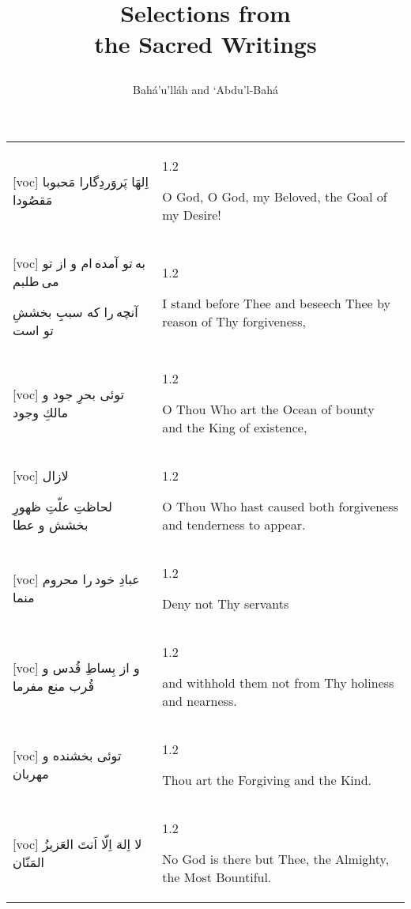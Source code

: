 \documentclass[11pt]{article}
\title{
\Huge
\vspace*{2in}
Selections from \\
the Sacred Writings \\
\vspace{.25in}
\fontsize{48}{36}
\begin{arab}
\end{arab}
\vspace{1in}}
\author{\LARGE Bahá’u’lláh and `Abdu'l-Bahá}
\date{}
\makeatletter
\newenvironment{orig}
  {\begin{farsi}[voc]}
  {\end{farsi}}
\newenvironment{trans}
  {\Large\begin{spacing}{1.2}\raggedright}
  {\end{spacing}}
\newenvironment{word}
  {\begin{tabular}[t]{p{2.75in}@{\hspace{3em}}p{2.875in}}}
  {\end{tabular}}
\newcommand{\ayat}[2]{\begin{orig}#1\end{orig} & \begin{trans}#2\end{trans}}
\makeatother
\begin{document}
\maketitle
\thispagestyle{empty}

\newpage

\fontsize{24}{32}

\begin{word}
\ayat{
اِلهَا پَروَردِگارا مَحبوبا مَقصُودا
}{O God, O God, my Beloved, the Goal of my Desire!} \\ \ayat{
به تو آمده ام و از تو می طلبم

آنچه را كه سببِ بخششِ تو است
}{I stand before Thee and beseech Thee by reason of Thy forgiveness,} \\ \ayat{
توئی بحرِ جود و مالكِ وجود
}{O Thou Who art the Ocean of bounty and the King of existence,} \\ \ayat{
لازال

لحاظتِ علّتِ ظهورِ بخشش و عطا
}{O Thou Who hast caused both forgiveness and tenderness to appear.} \\ \ayat{
عبادِ خود را محروم منما
}{Deny not Thy servants} \\ \ayat{
و از بِساطِ قُدس و قُرب منع مفرما
}{and withhold them not from Thy holiness and nearness.} \\ \ayat{
توئی بخشنده و مهربان
}{Thou art the Forgiving and the Kind.} \\ \ayat{
لا اِلهَ اِلّا اَنتَ العَزيزُ المَنّان
}{No God is there but Thee, the Almighty, the Most Bountiful.}
\end{word}

\newpage
\end{document}
